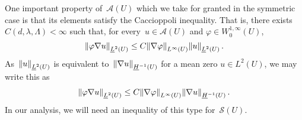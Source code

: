 \documentclass[11pt]{article} %
\numberwithin{equation}{section}
\theoremstyle{definition}
\let\originalleft\left
\let\originalright\right
\renewcommand{\left}{\mathopen{}\mathclose\bgroup\originalleft}
\renewcommand{\right}{\aftergroup\egroup\originalright}
\newcommand{\A}{\mathcal{A}}
\begin{document}
One important property of~$\A(U)$ which we take for granted in the symmetric case is that its elements satisfy the Caccioppoli inequality. That is, there exists~$C(d,\lambda,\Lambda)<\infty$ such that, for every~$u\in \mathcal{A}(U)$ and $\varphi \in W^{1,\infty}_0(U)$,  
\begin{equation}
\label{e.A.caccioppoli.0}
\left\| \varphi \nabla u \right\|_{\underline{L}^2(U)}
\leq
C \left\| \nabla \varphi \right\|_{L^\infty(U)} 
\left\| u \right\|_{\underline{L}^{2}(U)}
\,.
\end{equation}
As~$\left\| u \right\|_{\underline{L}^{2}(U)}$ is equivalent to~$\left\| \nabla u \right\|_{\underline{H}^{-1}(U)}$ for a mean zero $u\in L^2(U)$, we may write this as 
\begin{align}
\label{e.A.caccioppoli}
\left\| \varphi \nabla u \right\|_{\underline{L}^2(U)}
\leq
C \left\| \nabla \varphi \right\|_{L^\infty(U)} 
\left\| \nabla u \right\|_{\underline{H}^{-1}(U)}
\,.
\end{align}
In our analysis, we will need an inequality of this type for~$\mathcal{S}(U)$.
\end{document}
